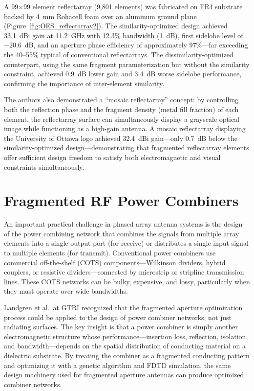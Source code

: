 A 99$\times$99 element reflectarray (9{,}801 elements) was fabricated on FR4 substrate backed by 4~mm Rohacell foam over an aluminum ground plane (Figure~\ref{fig:OES_reflectarray2}).  The similarity-optimized design achieved 33.1~dBi gain at 11.2~GHz with 12.3\% bandwidth (1~dB), first sidelobe level of $-20.6$~dB, and an aperture phase efficiency of approximately 97\%---far exceeding the 40--55\% typical of conventional reflectarrays.  The dissimilarity-optimized counterpart, using the same fragment parameterization but without the similarity constraint, achieved 0.9~dB lower gain and 3.4~dB worse sidelobe performance, confirming the importance of inter-element similarity.

The authors also demonstrated a ``mosaic reflectarray'' concept: by controlling both the reflection phase and the fragment density (metal fill fraction) of each element, the reflectarray surface can simultaneously display a grayscale optical image while functioning as a high-gain antenna.  A mosaic reflectarray displaying the University of Ottawa logo achieved 32.4~dBi gain---only 0.7~dB below the similarity-optimized design---demonstrating that fragmented reflectarray elements offer sufficient design freedom to satisfy both electromagnetic and visual constraints simultaneously.


\section{Fragmented RF Power Combiners}
\label{sec:combiners}

An important practical challenge in phased array antenna systems is the design of the power combining network that combines the signals from multiple array elements into a single output port (for receive) or distributes a single input signal to multiple elements (for transmit).  Conventional power combiners use commercial off-the-shelf (COTS) components---Wilkinson dividers, hybrid couplers, or resistive dividers---connected by microstrip or stripline transmission lines.  These COTS networks can be bulky, expensive, and lossy, particularly when they must operate over wide bandwidths.

Landgren et al.\ at GTRI recognized that the fragmented aperture optimization process could be applied to the design of power combiner networks, not just radiating surfaces.  The key insight is that a power combiner is simply another electromagnetic structure whose performance---insertion loss, reflection, isolation, and bandwidth---depends on the spatial distribution of conducting material on a dielectric substrate.  By treating the combiner as a fragmented conducting pattern and optimizing it with a genetic algorithm and FDTD simulation, the same design machinery used for fragmented aperture antennas can produce optimized combiner networks.

